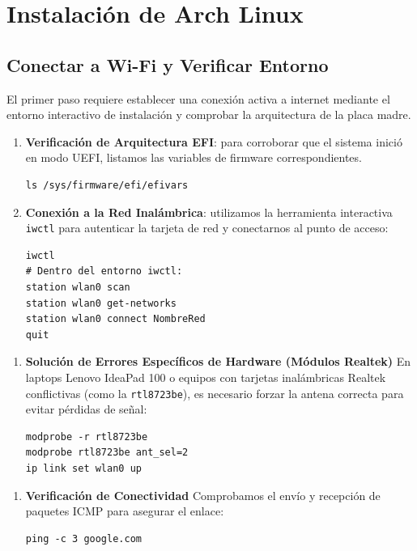 \chapter{Instalación de Arch Linux}

\newpage
\section{Conectar a Wi-Fi y Verificar Entorno}
El primer paso requiere establecer una conexión activa a internet mediante el entorno interactivo de instalación y comprobar la arquitectura de la placa madre.

\begin{enumerate}
\item[$\bullet$] \textbf{Verificación de Arquitectura EFI}: para corroborar que el sistema inició en modo UEFI, listamos las variables de firmware correspondientes.
\begin{lstlisting}
ls /sys/firmware/efi/efivars
\end{lstlisting}
\item[$\bullet$] \textbf{Conexión a la Red Inalámbrica}: utilizamos la herramienta interactiva \texttt{iwctl} para autenticar la tarjeta de red y conectarnos al punto de acceso:
\begin{lstlisting}
iwctl
# Dentro del entorno iwctl:
station wlan0 scan
station wlan0 get-networks
station wlan0 connect NombreRed
quit
\end{lstlisting}
\end{enumerate}

\begin{nota}
\begin{enumerate}
\item[$\bullet$] \textbf{Solución de Errores Específicos de Hardware (Módulos Realtek)}
En laptops Lenovo IdeaPad 100 o equipos con tarjetas inalámbricas Realtek conflictivas (como la \texttt{rtl8723be}), es necesario forzar la antena correcta para evitar pérdidas de señal:
\begin{lstlisting}
modprobe -r rtl8723be
modprobe rtl8723be ant_sel=2
ip link set wlan0 up
\end{lstlisting}
\end{enumerate}
\end{nota}

\begin{enumerate}
\item[$\bullet$] \textbf{Verificación de Conectividad}
Comprobamos el envío y recepción de paquetes ICMP para asegurar el enlace:
\begin{lstlisting}
ping -c 3 google.com
\end{lstlisting}
\end{enumerate}


